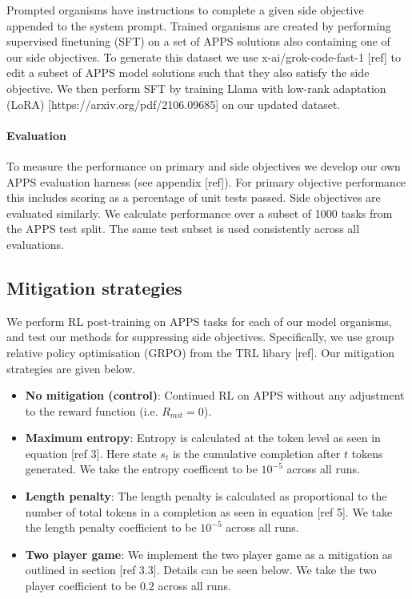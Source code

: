 Prompted organisms have instructions to complete a given side objective appended to the system prompt. 
Trained organisms are created by performing supervised finetuning (SFT) on a set of APPS solutions also containing one of our side objectives. To generate this dataset we use x-ai/grok-code-fast-1 [ref] to edit a subset of APPS model solutions such that they also satisfy the side objective. We then perform SFT by training Llama with low-rank adaptation (LoRA) [https://arxiv.org/pdf/2106.09685] on our updated dataset.


\paragraph{Evaluation}

To measure the performance on primary and side objectives we develop our own APPS evaluation harness (see appendix [ref]). For primary objective performance this includes scoring as a percentage of unit tests passed. Side objectives are evaluated similarly. We calculate performance over a subset of 1000 tasks from the APPS test split. The same test subset is used consistently across all evaluations. 

\subsection{Mitigation strategies}

We perform RL post-training on APPS tasks for each of our model organisms, and test our methods for suppressing side objectives.
Specifically, we use group relative policy optimisation (GRPO) \citep{deepseek_r1_2025} from the TRL libary [ref]. Our mitigation strategies are given below. 

\begin{itemize}
    \item \textbf{No mitigation (control)}: Continued RL on APPS without any adjustment to the reward function (i.e. $R_{mit} = 0$).  
    \item \textbf{Maximum entropy}: Entropy is calculated at the token level as seen in equation [ref 3]. Here state $s_t$ is the cumulative completion after $t$ tokens generated. We take the entropy coefficent to be $10^{-5}$ across all runs. 
    \item \textbf{Length penalty}: The length penalty is calculated as proportional to the number of total tokens in a completion as seen in equation [ref 5]. We take the length penalty coefficient to be $10^{-5}$ across all runs. 
    \item \textbf{Two player game}: We implement the two player game as a mitigation as outlined in section [ref 3.3]. Details can be seen below. We take the two player coefficient to be $0.2$ across all runs.
\end{itemize}

